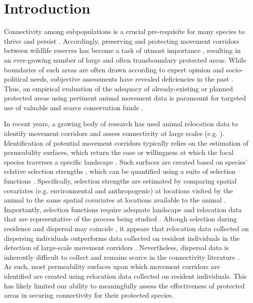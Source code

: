 \documentclass[abstract=on,10pt,a4paper,bibliography=totocnumbered]{article}
\begin{document}
\newpage


\linenumbers

\section{Introduction}
Connectivity among subpopulations is a crucial pre-requisite for many species to
thrive and persist \citep{Fahrig.2003}. Accordingly, preserving and protecting
movement corridors between wildlife reserves has become a task of utmost
importance \citep{Doerr.2011, Rudnick.2012}, resulting in an ever-growing number
of large and often transboundary protected areas. While boundaries of such areas
are often drawn according to expert opinion and socio-political needs,
subjective assessments have revealed deficiencies in the past
\citep{Clevenger.2002, Pullinger.2010}. Thus, an empirical evaluation of the
adequacy of already-existing or planned protected areas using pertinent animal
movement data is paramount for targeted use of valuable and scarce conservation
funds \citep{Pullinger.2010}.

In recent years, a growing body of research has used animal relocation data to
identify movement corridors and assess connectivity at large scales (e.g.
\citealp{Chetkiewicz.2006, Squires.2013, Elliot.2014}). Identification of
potential movement corridors typically relies on the estimation of permeability
surfaces, which return the ease or willingness at which the focal species
traverses a specific landscape \citep{Sawyer.2011}. Such surfaces are created
based on species' relative selection strengths \citep{Avgar.2017}, which can be
quantified using a suite of selection functions \citep{Zeller.2012}.
Specifically, selection strengths are estimated by comparing spatial covariates
(e.g. environmental and anthropogenic) at locations visited by the animal to the
same spatial covariates at locations available to the animal
\citep{Zeller.2012}. Importantly, selection functions require adequate landscape
and relocation data that are representative of the process being studied
\citep{Diniz.2020}. Altough selection during residence and dispersal may
coincide \citep{Fattebert.2015}, it appears that relocation data collected on
dispersing individuals outperforms data collected on resident individuals in the
detection of large-scale movement corridors \citep{Elliot.2014, Abrahms.2017,
Diniz.2020}. Nevertheless, dispersal data is inherently difficult to collect and
remains scarce in the connectivity literature \citep{Vasudev.2015}. As such,
most permeability surfaces upon which movement corridors are identified are
created using relocation data collected on resident individuals. This has likely
limited our ability to meaningfully assess the effectiveness of protected areas
in securing connectivity for their protected species.
\end{document}
